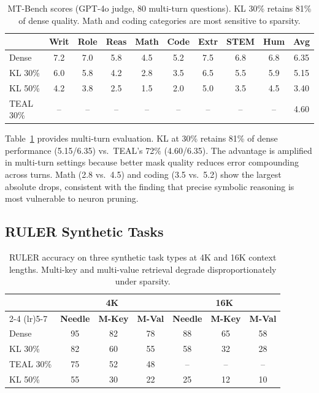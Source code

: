 \documentclass[11pt,a4paper]{article}
\begin{document}
\begin{table}[t]
\centering
\caption{MT-Bench scores (GPT-4o judge, 80 multi-turn questions). KL 30\% retains 81\% of dense quality. Math and coding categories are most sensitive to sparsity.}
\label{tab:mtbench}
\small
\begin{tabular}{lcccccccc|c}
\toprule
 & \textbf{Writ} & \textbf{Role} & \textbf{Reas} & \textbf{Math} & \textbf{Code} & \textbf{Extr} & \textbf{STEM} & \textbf{Hum} & \textbf{Avg} \\
\midrule
Dense & 7.2 & 7.0 & 5.8 & 4.5 & 5.2 & 7.5 & 6.8 & 6.8 & 6.35 \\
KL 30\% & 6.0 & 5.8 & 4.2 & 2.8 & 3.5 & 6.5 & 5.5 & 5.9 & 5.15 \\
KL 50\% & 4.2 & 3.8 & 2.5 & 1.5 & 2.0 & 5.0 & 3.5 & 4.5 & 3.40 \\
TEAL 30\% & -- & -- & -- & -- & -- & -- & -- & -- & 4.60 \\
\bottomrule
\end{tabular}
\end{table}

Table~\ref{tab:mtbench} provides multi-turn evaluation. KL at 30\% retains 81\% of dense performance (5.15/6.35) vs.\ TEAL's 72\% (4.60/6.35). The advantage is amplified in multi-turn settings because better mask quality reduces error compounding across turns. Math (2.8 vs.\ 4.5) and coding (3.5 vs.\ 5.2) show the largest absolute drops, consistent with the finding that precise symbolic reasoning is most vulnerable to neuron pruning.

\subsection{RULER Synthetic Tasks}

\begin{table}[t]
\centering
\caption{RULER accuracy on three synthetic task types at 4K and 16K context lengths. Multi-key and multi-value retrieval degrade disproportionately under sparsity.}
\label{tab:ruler}
\small
\begin{tabular}{lcccccc}
\toprule
 & \multicolumn{3}{c}{\textbf{4K}} & \multicolumn{3}{c}{\textbf{16K}} \\
\cmidrule(lr){2-4} \cmidrule(lr){5-7}
 & \textbf{Needle} & \textbf{M-Key} & \textbf{M-Val} & \textbf{Needle} & \textbf{M-Key} & \textbf{M-Val} \\
\midrule
Dense & 95 & 82 & 78 & 88 & 65 & 58 \\
KL 30\% & 82 & 60 & 55 & 58 & 32 & 28 \\
TEAL 30\% & 75 & 52 & 48 & -- & -- & -- \\
KL 50\% & 55 & 30 & 22 & 25 & 12 & 10 \\
\bottomrule
\end{tabular}
\end{table}
\end{document}
